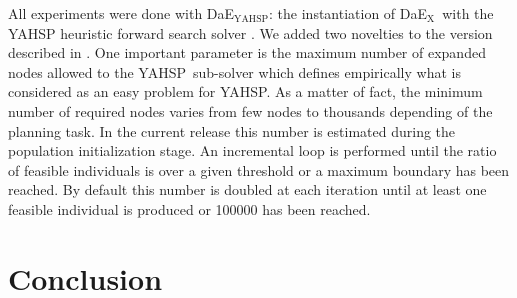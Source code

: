 \documentclass[letterpaper]{article}
\newcommand{\DAEX}{{\sc DaE$_{\text{X}}$}}
\newcommand{\DAEYAHSP}{{\sc DaE$_{\text{YAHSP}}$}}
\newcommand{\YAHSP}{{\sc YAHSP}}
\begin{document}
All experiments were done with \DAEYAHSP: the instantiation of \DAEX\ with the
YAHSP heuristic forward search  solver \cite{yahsp:icaps2004}. %
We added two novelties to the version described in
\cite{dae:icaps2010}.  One important parameter is the maximum number of expanded
nodes allowed to the \YAHSP\ sub-solver which defines empirically what is
considered as an easy problem for \YAHSP. As a matter of fact, the minimum
number of required nodes varies from few nodes to thousands depending of the
planning task.  In the current release this number is estimated during the
population initialization stage. An incremental loop is performed until the
ratio of feasible individuals is over a given threshold or a maximum boundary has
been reached. By default this number is doubled at each iteration until at least
one feasible individual is produced or 100000 has been reached.

\section{Conclusion}



\end{document}

